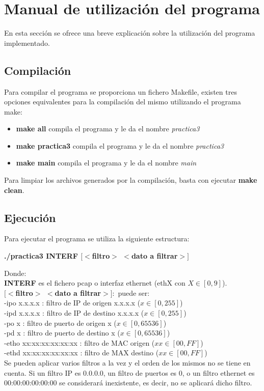 \documentclass[a4paper, 11pt]{article}	%
\begin{document}
\clearpage
\appendix
\renewcommand\appendixname{Anexo}
\section{Manual de utilización del programa}
\label{sec:manual}
En esta sección se ofrece una breve explicación sobre la utilización del programa implementado.
\subsection{Compilación}
Para compilar el programa se proporciona un fichero Makefile, existen tres opciones equivalentes para la compilación del mismo utilizando el programa make:
\begin{itemize}
\item \textbf{make all} compila el programa y le da el nombre \textit{practica3}
\item \textbf{make practica3} compila el programa y le da el nombre \textit{practica3}
\item \textbf{make main} compila el programa y le da el nombre \textit{main}
\end{itemize}

Para limpiar los archivos generados por la compilación, basta con ejecutar \textbf{make clean}.

\subsection{Ejecución}
Para ejecutar el programa se utiliza la siguiente estructura:

\begin{center}
\textbf{./practica3 INTERF $[<$filtro$>$ $<$dato a filtrar$>]$}
\end{center}

\noindent Donde:\\
\textbf{INTERF} es el fichero pcap o interfaz ethernet (ethX con $X \in [0,9]$).\\
\textbf{$[<$filtro$>$ $<$dato a filtrar$>]:$} puede ser:\\
\indent -ipo x.x.x.x : filtro de IP de origen x.x.x.x ($x \in [0, 255]$)\\
\indent -ipd x.x.x.x : filtro de IP de destino x.x.x.x ($x \in [0, 255]$)\\
\indent -po x : filtro de puerto de origen x ($x \in [0,65536]$)\\
\indent -pd x : filtro de puerto de destino x ($x \in [0,65536]$)\\
\indent -etho xx:xx:xx:xx:xx:xx : filtro de MAC origen ($xx \in [00,FF]$)\\
\indent -ethd xx:xx:xx:xx:xx:xx : filtro de MAX destino ($xx \in [00,FF]$)\\

Se pueden aplicar varios filtros a la vez y el orden de los mismos no se tiene en cuenta.
Si un filtro IP es 0.0.0.0, un filtro de puertos es 0, o un filtro ethernet es 00:00:00:00:00:00 se considerará inexistente, es decir, no se aplicará dicho filtro.
\end{document}
